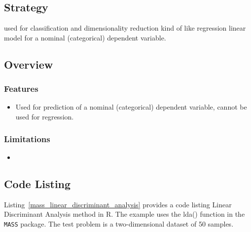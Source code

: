 \subsection{Strategy}

used for classification and dimensionality reduction
kind of like regression
linear model for a nominal (categorical) dependent variable.


\subsection{Overview}

\subsubsection{Features}

\begin{itemize}
	\item Used for prediction of a nominal (categorical) dependent variable, cannot be used for regression.
\end{itemize}

\subsubsection{Limitations}

\begin{itemize}
	\item 
\end{itemize}


\subsection{Code Listing}
Listing~\ref{mass_linear_discriminant_analysis} provides a code listing Linear Discriminant Analysis method in R.
The example uses the {lda()} function in the \texttt{MASS} package.
The test problem is a two-dimensional dataset of 50 samples.

